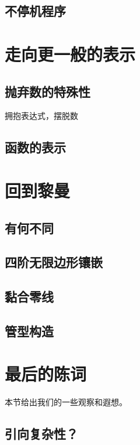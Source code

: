 \documentclass[a4paper,12pt]{article}
\numberwithin{definition}{section}
\numberwithin{lemma}{section}
\numberwithin{proposition}{section}
\numberwithin{theorem}{section}
\numberwithin{grammar}{section}
\numberwithin{program}{section}
\numberwithin{convention}{section}
\numberwithin{corollary}{section}
\begin{document}
\subsection{不停机程序}

\newpage

\section{走向更一般的表示}

\subsection{抛弃数的特殊性}

拥抱表达式，摆脱数

\subsection{函数的表示}

\newpage

\section{回到黎曼}

\subsection{有何不同}

\subsection{四阶无限边形镶嵌}

\subsection{黏合零线}

\subsection{管型构造}

\newpage

\section{最后的陈词}

本节给出我们的一些观察和遐想。

\subsection{引向复杂性？}
\end{document}
